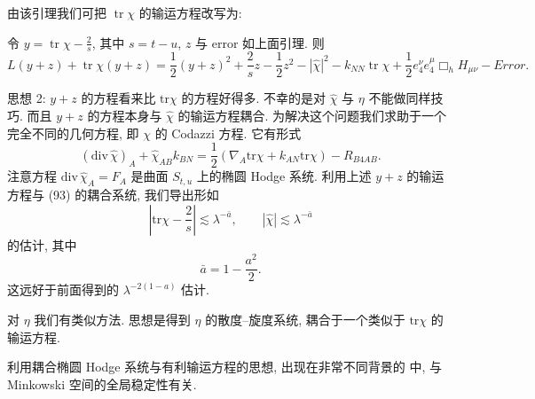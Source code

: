 由该引理我们可把 $\operatorname{tr}\chi$ 的输运方程改写为:
\setcounter{mtthm}{19}
\begin{proposition}\label{prop:3.20}
令 $y = \operatorname{tr}\chi - \tfrac{2}{s}$, 其中 $s = t - u$, $z$ 与 error 如上面引理. 则
\[
L(y+z)+\operatorname{tr}\chi(y+z)
=\frac{1}{2}(y+z)^{2}+\frac{2}{s}z-\frac{1}{2}z^{2}-|\hat{\chi}|^{2}
-k_{N N}\operatorname{tr}\chi+\frac{1}{2}e_{4}^{\nu}e_{4}^{\mu}\Box_{h}H_{\mu\nu}-Error.
\]
\end{proposition}

思想 2: $y + z$ 的方程看来比 $\text{tr}\chi$ 的方程好得多. 不幸的是对 $\hat{\chi}$ 与 $\eta$ 不能做同样技巧. 而且 $y + z$ 的方程本身与 $\hat{\chi}$ 的输运方程耦合. 为解决这个问题我们求助于一个完全不同的几何方程, 即 $\chi$ 的 Codazzi 方程. 它有形式
\[
(\mathrm{div}\,\hat{\chi})_{A}+\hat{\chi}_{A B}k_{B N}=\frac{1}{2}(\nabla_{A}\mathrm{tr}\chi+k_{A N}\mathrm{tr}\chi)-R_{B4A B}.
\]
注意方程 $\mathrm{div}\,\hat{\chi}_{A}=F_{A}$ 是曲面 $S_{t,u}$ 上的椭圆 Hodge 系统. 利用上述 $y+z$ 的输运方程与 (93) 的耦合系统, 我们导出形如
\[
|\mathrm{tr}\chi-\frac{2}{s}|\lesssim\lambda^{-\bar{a}},\qquad |\hat{\chi}|\lesssim\lambda^{-\bar{a}}
\]
的估计, 其中
\[
\bar{a}=1-\frac{a^{2}}{2}.
\]
这远好于前面得到的 $\lambda^{-2(1-a)}$ 估计.
\setcounter{mtthm}{20}
\begin{remark}\label{rem:3.21}
对 $\eta$ 我们有类似方法. 思想是得到 $\eta$ 的散度--旋度系统, 耦合于一个类似于 $\text{tr}\chi$ 的输运方程.\end{remark}

\setcounter{mtthm}{21}
\begin{remark}\label{rem:3.22}
利用耦合椭圆 Hodge 系统与有利输运方程的思想, 出现在非常不同背景的 \cite{klai12} 中, 与 Minkowski 空间的全局稳定性有关.\end{remark}
